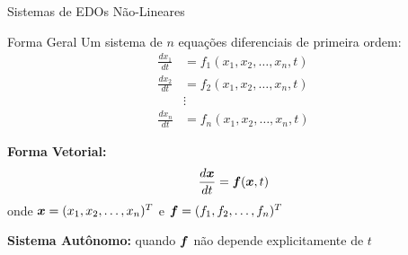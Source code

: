 \begin{frame}[allowframebreaks]{Sistemas de EDOs Não-Lineares}
\begin{block}{Forma Geral}
Um sistema de $n$ equações diferenciais de primeira ordem:
\begin{align*}
\frac{dx_1}{dt} &= f_1(x_1, x_2, \ldots, x_n, t)\\
\frac{dx_2}{dt} &= f_2(x_1, x_2, \ldots, x_n, t)\\
&\vdots\\
\frac{dx_n}{dt} &= f_n(x_1, x_2, \ldots, x_n, t)
\end{align*}
\end{block}

\textbf{Forma Vetorial:}
\begin{equation*}
\frac{d\boldsymbol{x}}{dt} = \boldsymbol{f}(\boldsymbol{x}, t)
\end{equation*}
onde $\boldsymbol{x} = (x_1, x_2, \ldots, x_n)^T$ e $\boldsymbol{f} = (f_1, f_2, \ldots, f_n)^T$

\vspace{0.3cm}

\textbf{Sistema Autônomo:} quando $\boldsymbol{f}$ não depende explicitamente de $t$
\end{frame}

